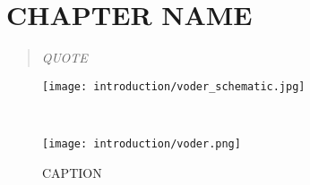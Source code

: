 \documentclass[../main.tex]{subfiles}
\begin{document}
\chapter{CHAPTER NAME}\label{chap:LABEL}

\bigskip
\begin{quote}
  \emph{QUOTE}
  
\end{quote}

\cleardoublepage%

\begin{figure}
    \centering
    \begin{minipage}{0.8\textwidth}
      \texttt{[image: introduction/voder\_schematic.jpg]}
      \subcaption{}
    \end{minipage}\\%
    \begin{minipage}{0.5\textwidth}
      \texttt{[image: introduction/voder.png]}
      \subcaption{}
    \end{minipage}
    \caption{CAPTION}\label{fig:voder}
  \end{figure}


\end{document}
